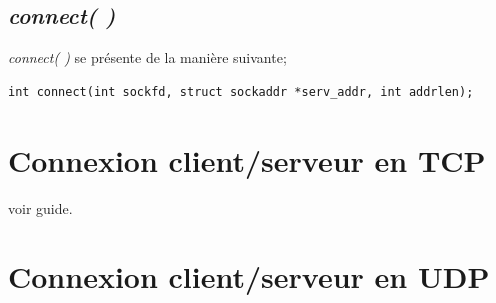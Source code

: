 \documentclass{report}
\begin{document}
\subsection{\emph{connect( )}}
\emph{connect( )} se présente de la manière suivante;
\begin{lstlisting}
int connect(int sockfd, struct sockaddr *serv_addr, int addrlen);
\end{lstlisting}


\section{Connexion client/serveur en TCP}
voir guide.

\section{Connexion client/serveur en UDP}
\end{document}
